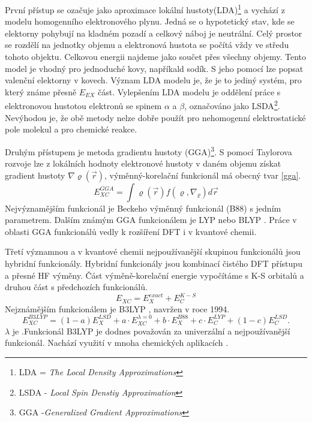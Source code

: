 \documentclass[
  digital, %
  table,   %
  lof,     %
  lot,     %
  oneside,
]{fithesis3}
\begin{document}
První přístup se ozačuje jako aproximace lokální hustoty(LDA)\footnote{LDA = \textit{The Local Density Approximations}} a vychází z modelu homogenního elektronového plynu. Jedná se o hypotetický stav, kde se elektorny pohybují na kladném pozadí a celkový náboj je neutrální. Celý prostor se rozdělí na jednotky objemu a elektronová hustota se počítá vždy ve středu tohoto objektu. Celkovou energii najdeme jako součet přes všechny objemy. Tento model je vhodný pro jednoduché kovy, napříkald sodík. S jeho pomocí lze popsat valenční elektorny v kovech. Význam LDA modelu je, že je to jediný systém, pro který známe přesně $E_{EX}$ část. Vylepšením LDA modelu je oddělení práce s elektronovou hustotou elektronů se spinem $\alpha$ a $\beta$, označováno jako LSDA\footnote{LSDA - \textit{Local Spin Denstiy Approximation}}. Nevýhodou je, že obě metody nelze dobře použít pro nehomogenní elektrostatické pole molekul a pro chemické reakce.

 Druhým přístupem je metoda gradientu hustoty (GGA)\footnote{GGA -\textit{Generalized Gradient Approximations}}. S pomocí Taylorova rozvoje lze z lokálních hodnoty elektronové hustoty v daném objemu získat gradient hustoty $\nabla \varrho(\vec{r})$, výměnný-korelační funkcionál má obecný tvar \ref{gga}.
\begin{equation}
  E_{XC}^{GGA} = \int \varrho(\vec{r})f(\varrho, \nabla_{\varrho})d\vec{r}
  \label{gga}
\end{equation}
 Nejvýznamějším funkcionál je Beckeho výměnný funkcionál (B88) s jedním parametrem. Dalším známým GGA funkcionálem je LYP \cite{lyp} nebo BLYP \cite{blyp}. Práce v oblasti GGA funkcionálů vedly k rozšíření DFT i v kvantové chemii.

 Třetí významnou a v kvantové chemii nejpoužívanější skupinou funkcionálů jsou hybridní funkcionály. Hybridní funkcionály jsou kombinací čistého DFT přístupu a přesné HF výměny. Část výměně-korelační energie vypočítáme s K-S orbitalů a druhou část s předchozích funkcionálů.
\begin{equation}
  E_{XC} = E_{X}^{exact} + E_C^{K-S}
\end{equation}
Nejznámějším funkcionálem je B3LYP \cite{b3lyp}, navržen v roce 1994.
\begin{equation}
  E_{XC}^{B3LYP} = (1-a)E_{X}^{LSD} + a \cdot E_{XC}^{\lambda = 0} + b \cdot E_{X}^{B88} + c \cdot E_{C}^{LYP} + (1-c)E_{C}^{LSD}.
\end{equation}
$\lambda$ je .Funkcionál B3LYP je dodnes považován za univerzální a nejpoužívanější funkcionál. Nachází využití v mnoha chemických aplikacích \cite{koch2000chemist}.
\end{document}
